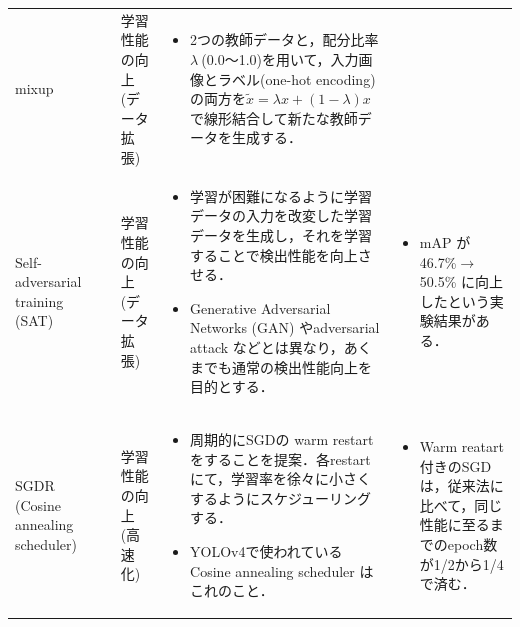 \documentclass[originalpaper,fleqn]{jsaiart}     %
\begin{document}
\begin{table}
\begin{center}
\begin{tabularx}{\linewidth}{Xp{1.5cm}Xp{7cm}X}
            mixup & \cite{ZCDL18} & 学習性能の向上 (データ拡張) & 
            \begin{itemize}
                \vspace{-0.7\baselineskip}
                \setlength{\leftskip}{-3mm}
                \item 2つの教師データと，配分比率$\lambda\ $(0.0〜1.0)を用いて，入力画像とラベル(one-hot encoding)の両方を$\tilde{x}=\lambda x+(1-\lambda)x$で線形結合して新たな教師データを生成する．
            \end{itemize}
            &
            \\

            Self-adversarial training (SAT) & \cite{BWL20} & 学習性能の向上 (データ拡張) & 
            \begin{itemize}
                \vspace{-0.7\baselineskip}
                \setlength{\leftskip}{-3mm}
                \item 学習が困難になるように学習データの入力を改変した学習データを生成し，それを学習することで検出性能を向上させる．
                \item Generative Adversarial Networks (GAN) やadversarial attack などとは異なり，あくまでも通常の検出性能向上を目的とする．
            \end{itemize}
            &
            \begin{itemize}
                \vspace{-0.7\baselineskip}
                \setlength{\leftskip}{-3mm}
                \item mAP が 46.7\%{$\rightarrow$}50.5\% に向上したという実験結果がある．
            \end{itemize}
            \\

            SGDR (Cosine annealing scheduler) & \cite{LoshHut17} & 学習性能の向上 (高速化) & 
            \begin{itemize}
                \vspace{-0.7\baselineskip}
                \setlength{\leftskip}{-3mm}
                \item 周期的にSGDの warm restart をすることを提案．各restartにて，学習率を徐々に小さくするようにスケジューリングする．
                \item YOLOv4で使われている Cosine annealing scheduler はこれのこと．
            \end{itemize}
            &
            \begin{itemize}
                \vspace{-0.7\baselineskip}
                \setlength{\leftskip}{-3mm}
                \item Warm reatart付きのSGDは，従来法に比べて，同じ性能に至るまでのepoch数が1/2から1/4で済む．
            \end{itemize}
            \\


\end{tabularx}
\end{center}
\end{table}
\end{document}
